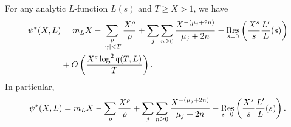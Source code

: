     \begin{theorem*}
      For any analytic \(L\)-function \(L(s)\) and \(T \ge X > 1\), we have
      \begin{align*}
        \psi^{\ast}(X,L) &= m_{L}X-\sum_{\substack{\rho \\ |\gamma| < T}}\frac{X^{\rho}}{\rho}+\sum_{j}\sum_{n \ge 0}\frac{X^{-(\mu_{j}+2n)}}{\mu_{j}+2n}-\operatorname*{\mathrm{Res}}_{s = 0}\left(\frac{X^{s}}{s}\frac{L'}{L}(s)\right) \\
        &+ O\left(\frac{X^{c}\log^{2}\mathfrak{q}(T,L)}{T}\right).
      \end{align*}
      In particular,
      \[
        \psi^{\ast}(X,L) = m_{L}X-\sum_{\rho }\frac{X^{\rho}}{\rho}+\sum_{j}\sum_{n \ge 0}\frac{X^{-(\mu_{j}+2n)}}{\mu_{j}+2n}-\operatorname*{\mathrm{Res}}_{s = 0}\left(\frac{X^{s}}{s}\frac{L'}{L}(s)\right).
      \]
    \end{theorem*}
